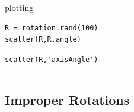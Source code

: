 \documentclass[compress]{beamer}
\begin{document}
\begin{frame}[fragile]
\begin{columns}
\begin{column}{8cm}
\begin{overlayarea}{8cm}{8cm}
\pause

plotting
\vspace{-0.2cm}
\begin{lstlisting}[style=input]
R = rotation.rand(100)
scatter(R,R.angle)
\end{lstlisting}

\pause

\begin{lstlisting}[style=input]
scatter(R,'axisAngle')
\end{lstlisting}

\end{overlayarea}
\end{column}

\begin{column}{3.7cm}
  \vspace{-0.5cm}
\end{column}

\end{columns}

\end{frame}

\subsection*{Improper Rotations}
\end{document}
